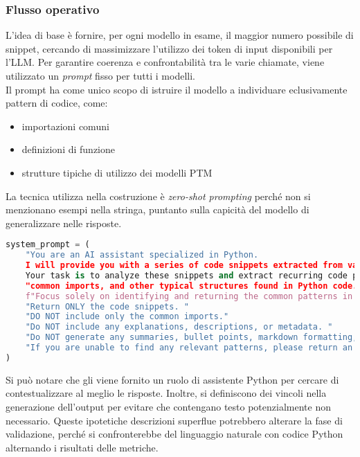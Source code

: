 \documentclass{article}
\begin{document}
\subsubsection{Flusso operativo}
L'idea di base è fornire, per ogni modello in esame, il maggior numero possibile di snippet, cercando di massimizzare l’utilizzo dei token di input disponibili per l’LLM. Per garantire coerenza e confrontabilità tra le varie chiamate, viene utilizzato un \textit{prompt} fisso per tutti i modelli. \\
Il prompt ha come unico scopo di istruire il modello a individuare eclusivamente pattern di codice, come:
\begin{itemize}
    \item importazioni comuni
    \item definizioni di funzione
    \item strutture tipiche di utilizzo dei modelli PTM
\end{itemize}
La tecnica utilizza nella costruzione è \textit{zero-shot prompting} perché non si menzionano esempi nella stringa, puntanto sulla capicità del modello di generalizzare nelle risposte.
\begin{lstlisting}[language=Python, caption={System prompt per l'LLM}, label={lst:system-prompt}]
system_prompt = (
    "You are an AI assistant specialized in Python. 
    I will provide you with a series of code snippets extracted from various Python files. Note that these snippets might not form a coherent or complete code module when combined together.
    Your task is to analyze these snippets and extract recurring code patterns, such as function definitions (using 'def'), "
    "common imports, and other typical structures found in Python code. "
    f"Focus solely on identifying and returning the common patterns in the context of the model '{snippet_model}'.\n"
    "Return ONLY the code snippets. "
    "DO NOT include only the common imports."
    "Do NOT include any explanations, descriptions, or metadata. "
    "Do NOT generate any summaries, bullet points, markdown formatting, or additional text. "
    "If you are unable to find any relevant patterns, please return an empty string."
)
\end{lstlisting}
Si può notare che gli viene fornito un ruolo di assistente Python per cercare di contestualizzare al meglio le risposte. Inoltre, si definiscono dei vincoli nella generazione dell'output per evitare che contengano testo potenzialmente non necessario. Queste ipotetiche descrizioni superflue potrebbero alterare la fase di validazione, perché si confronterebbe del linguaggio naturale con codice Python alternando i risultati delle metriche.
\end{document}
